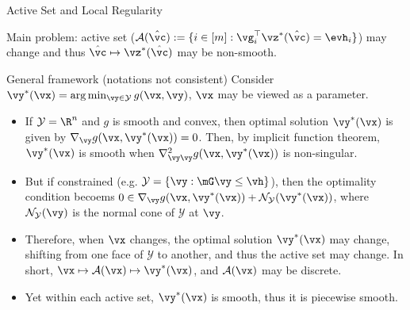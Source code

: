 \documentclass[10pt,aspectratio=169,xcolor=dvipsnames]{beamer}
\begin{document}
\begin{frame}{Active Set and Local Regularity}

    Main problem: active set ($\mathcal{A}(\hat{\vc}):=\{i \in [m] : \vg_i^\top \vz^*(\hat{\vc}) = \evh_i\}$) may change and thus $\hat{\vc} \mapsto \vz^*(\hat{\vc})$ may be non-smooth.
    \begin{block}{General framework (notations not consistent)}
       Consider $\vy^*(\vx) = \arg\min_{\vy \in \mathcal{Y}} g(\vx,\vy)$, $\vx$ may be viewed as a parameter.
       \begin{itemize}
            \item If $\mathcal{Y} = \R^n$ and $g$ is smooth and convex, then optimal solution $\vy^*(\vx)$ is given by $\nabla_{\vy} g(\vx,\vy^*(\vx)) = 0$. Then, by implicit function theorem, $\vy^*(\vx)$ is smooth when $\nabla^2_{\vy\vy} g(\vx,\vy^*(\vx))$ is non-singular.
            \item But if constrained (e.g. $\mathcal{Y} = \{\vy : \mG\vy \leq \vh\}$), then the optimality condition becoems $0 \in \nabla_{\vy} g(\vx,\vy^*(\vx)) + \mathcal{N}_{\mathcal{Y}}(\vy^*(\vx))$, where $\mathcal{N}_{\mathcal{Y}}(\vy)$ is the normal cone of $\mathcal{Y}$ at $\vy$.
            \item Therefore, when $\vx$ changes, the optimal solution $\vy^*(\vx)$ may change, shifting from one face of $\mathcal{Y}$ to another, and thus the active set may change. In short, $\vx \mapsto \mathcal{A}(\vx) \mapsto \vy^*(\vx)$, and $\mathcal{A}(\vx)$ may be discrete.
            \item Yet within each active set, $\vy^*(\vx)$ is smooth, thus it is piecewise smooth.
       \end{itemize}


    \end{block}


\end{frame}
\end{document}
